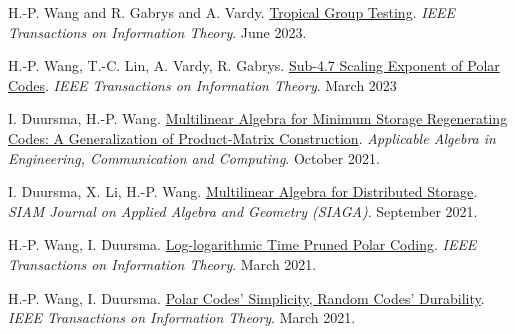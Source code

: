 \documentclass{article}
\def\sec#1{\vskip1em\textbf{\fs1#1}}
\def\fs#1{%
        \pgfmathsetmacro\a{#1}%
        \pgfmathsetmacro\A{\parskip*(4/3)^\a}%
        \pgfmathsetmacro\B{\A*(4/3)}%
        \fontsize{\A pt}{\B pt}\selectfont%
    }
\begin{document}
\bgroup
\def\section#1#2{\sec{Journal Publications \mdseries (new to old)}}
\begin{thebibliography}{J9}
    H.-P. Wang and R. Gabrys and A. Vardy.
    \href{https://ieeexplore.ieee.org/document/10146331/}
    {Tropical Group Testing}.
    \emph{IEEE Transactions on Information Theory}.
    June 2023.

    H.-P. Wang, T.-C. Lin, A. Vardy, R. Gabrys.
    \href{https://doi.org/10.1109/TIT.2023.3253074}
    {Sub-4.7 Scaling Exponent of Polar Codes}.
    \emph{IEEE Transactions on Information Theory}.
    March 2023

    I. Duursma, H.-P. Wang.
    \href{https://doi.org/10.1007/s00200-021-00526-3}
    {Multilinear Algebra for Minimum Storage Regenerating Codes:
        A Generalization of Product-Matrix Construction}.
    \emph{Applicable Algebra in Engineering, Communication and Computing}.
    October 2021.

    I. Duursma, X. Li, H.-P. Wang.
    \href{https://doi.org/10.1137/20M1346742}
    {Multilinear Algebra for Distributed Storage}.
    \emph{SIAM Journal on Applied Algebra and Geometry (SIAGA)}.
    September 2021.

    H.-P. Wang, I. Duursma.
    \href{https://doi.org/10.1109/TIT.2020.3041523}
    {Log-logarithmic Time Pruned Polar Coding}.
    \emph{IEEE Transactions on Information Theory}.
    March 2021.

    H.-P. Wang, I. Duursma.
    \href{https://doi.org/10.1109/TIT.2020.3041570}
    {Polar Codes' Simplicity, Random Codes' Durability}.
    \emph{IEEE Transactions on Information Theory}.
    March 2021.
\end{thebibliography}
\egroup
\end{document}
